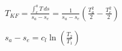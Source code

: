 \( T_{KF} = \frac{\int_{e}^{a} T \, ds}{s_a - s_e} = \frac{1}{s_a - s_e} \left( \frac{T_a^2}{2} - \frac{T_e^2}{2} \right) \)  

\( s_a - s_e = c_{l} \ln \left( \frac{T_2}{T_1} \right) \)